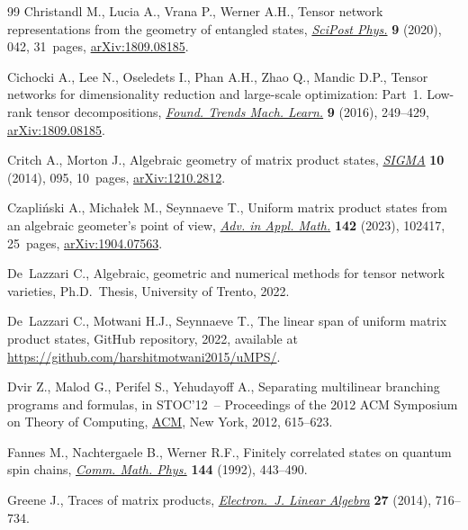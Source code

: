 \documentclass[pdftex]{sigma}
\numberwithin{equation}{section}
\begin{document}
\begin{thebibliography}{99}
Christandl M., Lucia A., Vrana P., Werner A.H., Tensor network representations
  from the geometry of entangled states, \href{https://doi.org/10.21468/scipostphys.9.3.042}{\textit{SciPost Phys.}} \textbf{9}
  (2020), 042, 31~pages, \href{https://arxiv.org/abs/1809.08185}{arXiv:1809.08185}.

Cichocki A., Lee N., Oseledets I., Phan A.H., Zhao Q., Mandic D.P., Tensor
  networks for dimensionality reduction and large-scale optimization: Part~1. Low-rank tensor decompositions, \href{http://doi.org/10.1561/2200000059}{\textit{Found. Trends Mach. Learn.}} \textbf{9} (2016), 249--429, \href{https://arxiv.org/abs/1809.08185}{arXiv:1809.08185}.

Critch A., Morton J., Algebraic geometry of matrix product states,
  \href{https://doi.org/10.3842/SIGMA.2014.095}{\textit{SIGMA}} \textbf{10} (2014), 095, 10~pages, \href{https://arxiv.org/abs/1210.2812}{arXiv:1210.2812}.

Czapli\'nski A., Micha{\l}ek M., Seynnaeve T., Uniform matrix product states
  from an algebraic geometer's point of view, \href{https://doi.org/10.1016/j.aam.2022.102417}{\textit{Adv. in Appl. Math.}}
  \textbf{142} (2023), 102417, 25~pages, \href{https://arxiv.org/abs/1904.07563}{arXiv:1904.07563}.

De~Lazzari C., Algebraic, geometric and numerical methods for tensor network
  varieties, Ph.D.~Thesis, {U}niversity of Trento, 2022.

De~Lazzari C., Motwani H.J., Seynnaeve T., The linear span of uniform matrix
  product states, {GitHub} repository, 2022, available at
  \url{https://github.com/harshitmotwani2015/uMPS/}.

Dvir Z., Malod G., Perifel S., Yehudayoff A., Separating multilinear branching
  programs and formulas, in S{TOC}'12~-- {P}roceedings of the 2012 {ACM}
  {S}ymposium on {T}heory of {C}omputing, \href{https://doi.org/10.1145/2213977.2214034}{ACM}, New York, 2012, 615--623.

Fannes M., Nachtergaele B., Werner R.F., Finitely correlated states on quantum
  spin chains, \href{https://doi.org/10.1007/BF02099178}{\textit{Comm. Math. Phys.}} \textbf{144} (1992), 443--490.

Greene J., Traces of matrix products, \href{https://doi.org/10.13001/1081-3810.1999}{\textit{Electron.~J. Linear Algebra}}
  \textbf{27} (2014), 716--734.


\end{thebibliography}
\end{document}
